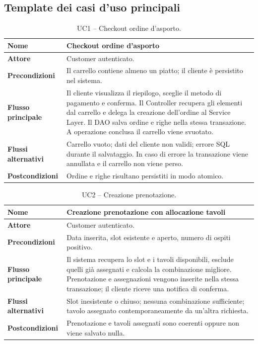 \documentclass[12pt,a4paper]{article}
\begin{document}
\subsection{Template dei casi d'uso principali}

\begingroup
\setlength{\arrayrulewidth}{0.3pt}
\setlength{\LTleft}{0.55cm}
\setlength{\LTright}{0.55cm}
\renewcommand{\arraystretch}{1.12}

\begin{longtable}{|>{\bfseries}p{3cm}|p{10.5cm}|}
\caption{UC1 -- Checkout ordine d'asporto.}\label{tab:uc-checkout}\\
\hline
Nome & Checkout ordine d'asporto \\
\hline
Attore & Customer autenticato. \\
\hline
Precondizioni & Il carrello contiene almeno un piatto; il cliente è persistito nel sistema. \\
\hline
Flusso principale &
Il cliente visualizza il riepilogo, sceglie il metodo di pagamento e conferma.
Il Controller recupera gli elementi dal carrello e delega la creazione
dell'ordine al Service Layer. Il DAO salva ordine e righe nella stessa
transazione. A operazione conclusa il carrello viene svuotato. \\
\hline
Flussi alternativi &
Carrello vuoto; dati del cliente non validi; errore SQL durante il salvataggio.
In caso di errore la transazione viene annullata e il carrello non viene perso. \\
\hline
Postcondizioni & Ordine e righe risultano persistiti in modo atomico. \\
\hline
\end{longtable}

\begin{longtable}{|>{\bfseries}p{3cm}|p{10.5cm}|}
\caption{UC2 -- Creazione prenotazione.}\label{tab:uc-reservation}\\
\hline
Nome & Creazione prenotazione con allocazione tavoli \\
\hline
Attore & Customer autenticato. \\
\hline
Precondizioni & Data inserita, slot esistente e aperto, numero di ospiti positivo. \\
\hline
Flusso principale &
Il sistema recupera lo slot e i tavoli disponibili, esclude quelli già assegnati
e calcola la combinazione migliore. Prenotazione e assegnazioni vengono inserite
nella stessa transazione; il cliente riceve una notifica di conferma. \\
\hline
Flussi alternativi &
Slot inesistente o chiuso; nessuna combinazione sufficiente; tavolo assegnato
contemporaneamente da un'altra richiesta. \\
\hline
Postcondizioni & Prenotazione e tavoli assegnati sono coerenti oppure non viene salvato nulla. \\
\hline
\end{longtable}
\end{document}
